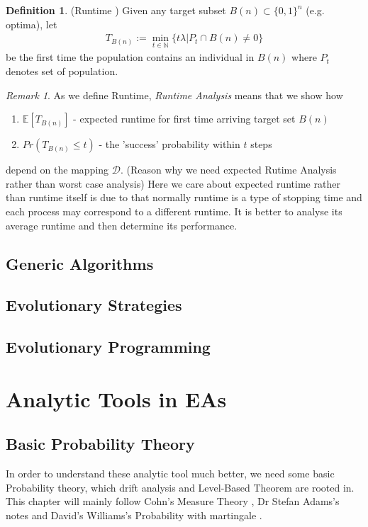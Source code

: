 \documentclass[a4paper,11pt]{report}
\theoremstyle{plain} %
\theoremstyle{definition} %
\newtheorem{defn}[thm]{Definition}
\theoremstyle{remark} %
\newtheorem*{rem}{Remark}
\begin{document}
\begin{defn} (Runtime \citep{Per2}) Given any target subset $B(n)\subset \{0,1\}^n$ (e.g. optima), let 
\begin{align*}
    T_{B(n)} := \min_{t\in \mathbb{N}} \{t \lambda  |   
    P_{t} \cap B(n) \neq 0\}
\end{align*}
be the first time the population contains an individual in $B(n)$ where $P_{t}$ denotes set of population. 
\end{defn}

\begin{rem}
As we define Runtime, \textit{Runtime Analysis} means that we show how  
\begin{enumerate}
    \item $\mathbb{E}[T_{B(n)}]$ - expected runtime for first time arriving target set $B(n)$ 
    
    \item $Pr(T_{B(n)}\leq t) $ - the 'success' probability within $t$ steps
\end{enumerate}
depend on the mapping $\mathcal{D}$. (Reason why we need expected Rutime Analysis rather than worst case analysis) Here we care about expected runtime rather than runtime itself is due to that normally runtime is a type of stopping time and each process may correspond to a different runtime. It is better to analyse its average runtime and then determine its performance.
\end{rem}

\section{Generic Algorithms}

\section{Evolutionary Strategies}

\section{Evolutionary Programming}


\chapter{Analytic Tools in EAs}


\section{Basic Probability Theory}
\par In order to understand these analytic tool much better, we need some basic Probability theory, which drift analysis and Level-Based Theorem are rooted in. This chapter will mainly follow Cohn's Measure Theory \citep{cohn_measure_2013}, Dr Stefan Adams's notes \citep{adams_ma3k0_nodate} and David's Williams's Probability with martingale \citep{williams1991probability}.
\end{document}
